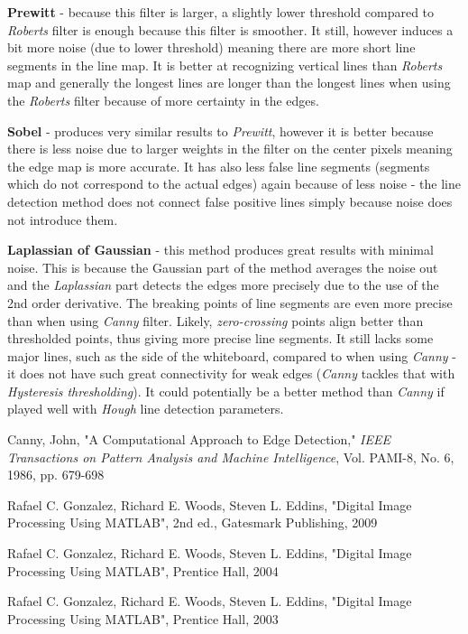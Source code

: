 \documentclass[lettersize,journal]{IEEEtran}
\begin{document}
\hfill

\noindent\textbf{Prewitt} - because this filter is larger, a slightly lower threshold compared to \emph{Roberts} filter is enough because this filter is smoother. It still, however induces a bit more noise (due to lower threshold) meaning there are more short line segments in the line map. It is better at recognizing vertical lines than \emph{Roberts} map and generally the longest lines are longer than the longest lines when using the \emph{Roberts} filter because of more certainty in the edges.

\hfill

\noindent\textbf{Sobel} - produces very similar results to \emph{Prewitt}, however it is better because there is less noise due to larger weights in the filter on the center pixels meaning the edge map is more accurate. It has also less false line segments (segments which do not correspond to the actual edges) again because of less noise - the line detection method does not connect false positive lines simply because noise does not introduce them.

\hfill

\noindent\textbf{Laplassian of Gaussian} - this method produces great results with minimal noise. This is because the Gaussian part of the method averages the noise out and the \emph{Laplassian} part detects the edges more precisely due to the use of the 2nd order derivative. The breaking points of line segments are even more precise than when using \emph{Canny} filter. Likely, \emph{zero-crossing} points align better than thresholded points, thus giving more precise line segments. It still lacks some major lines, such as the side of the whiteboard, compared to when using \emph{Canny} - it does not have such great connectivity for weak edges (\emph{Canny} tackles that with \emph{Hysteresis thresholding}). It could potentially be a better method than \emph{Canny} if played well with \emph{Hough} line detection parameters.


\begin{thebibliography}{1}


Canny, John, "A Computational Approach to Edge Detection," {\it{IEEE Transactions on Pattern Analysis and Machine Intelligence}}, Vol. PAMI-8, No. 6, 1986, pp. 679-698

Rafael C. Gonzalez, Richard E. Woods, Steven L. Eddins, "Digital Image Processing Using MATLAB", 2nd ed., Gatesmark Publishing, 2009

Rafael C. Gonzalez, Richard E. Woods, Steven L. Eddins, "Digital Image Processing Using MATLAB", Prentice Hall, 2004

Rafael C. Gonzalez, Richard E. Woods, Steven L. Eddins, "Digital Image Processing Using MATLAB", Prentice Hall, 2003

\end{thebibliography}
\end{document}
